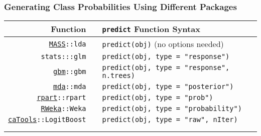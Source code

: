 \documentclass[12 pt]{beamer}\usepackage[]{graphicx}\usepackage[]{color}
\newcommand{\hlstr}[1]{\textcolor[rgb]{0.063,0.58,0.627}{#1}}%
\newcommand{\hlstd}[1]{\textcolor[rgb]{0.196,0.196,0.196}{#1}}%
\newcommand{\hlkwc}[1]{\textcolor[rgb]{0,0.631,0.314}{#1}}%
\newcommand{\hlkwd}[1]{\textcolor[rgb]{0.78,0.227,0.412}{#1}}%
\newcommand{\mxkwd}[1]{\texttt{\hlkwd{#1}}}%
\newcommand{\pkg}[1]{{\fontseries{b}\selectfont #1}}
\renewcommand{\pkg}[1]{{\color{darkgreen}\texttt{#1}}}
\begin{document}
  \begin{frame}[fragile]
\frametitle{Generating Class Probabilities Using Different Packages}

\begin{footnotesize}
\begin{center}
\begin{tabular}{rcl}
{\bf Function} && {\bf {\tt predict} Function Syntax} \\
\hline
 \href{http://cran.r-project.org/web/packages/MASS/index.html}{\pkg{MASS}}\texttt{::}\mxkwd{lda} && {\tt \hlkwd{predict}\hlstd{(obj)}} (no options needed)\\
\pkg{stats}\texttt{:::}\mxkwd{glm} && {\tt \hlkwd{predict}\hlstd{(obj,} \hlkwc{type} \hlstd{=} \hlstr{"response"}\hlstd{)}} \\
\href{http://cran.r-project.org/web/packages/gbm/index.html}{\pkg{gbm}}\texttt{::}\mxkwd{gbm} && {\tt \hlkwd{predict}\hlstd{(obj,} \hlkwc{type} \hlstd{=} \hlstr{"response"}\hlstd{, n.trees)}} \\
\href{http://cran.r-project.org/web/packages/mda/index.html}{\pkg{mda}}\texttt{::}\mxkwd{mda} && {\tt \hlkwd{predict}\hlstd{(obj,} \hlkwc{type} \hlstd{=} \hlstr{"posterior"}\hlstd{)}} \\
\href{http://cran.r-project.org/web/packages/rpart/index.html}{\pkg{rpart}}\texttt{::}\mxkwd{rpart} && {\tt \hlkwd{predict}\hlstd{(obj,} \hlkwc{type} \hlstd{=} \hlstr{"prob"}\hlstd{)}}   \\
\href{http://cran.r-project.org/web/packages/RWeka/index.html}{\pkg{RWeka}}\texttt{::}\mxkwd{Weka} && {\tt \hlkwd{predict}\hlstd{(obj,} \hlkwc{type} \hlstd{=} \hlstr{"probability"}\hlstd{)}}  \\
\href{http://cran.r-project.org/web/packages/caTools/index.html}{\pkg{caTools}}\texttt{::}\mxkwd{LogitBoost}  && {\tt \hlkwd{predict}\hlstd{(obj,} \hlkwc{type} \hlstd{=}  \hlstr{"raw"}\hlstd{, nIter)}} \\
\hline \\
\\
\end{tabular}
\end{center}
\end{footnotesize}
\end{frame}

\end{document}

